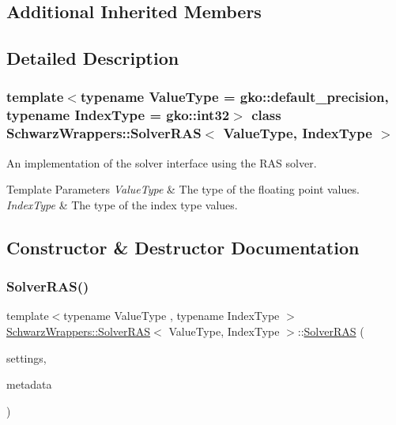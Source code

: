 \subsection*{Additional Inherited Members}


\subsection{Detailed Description}
\subsubsection*{template$<$typename Value\+Type = gko\+::default\+\_\+precision, typename Index\+Type = gko\+::int32$>$\newline
class Schwarz\+Wrappers\+::\+Solver\+R\+A\+S$<$ Value\+Type, Index\+Type $>$}

An implementation of the solver interface using the R\+AS solver. 


\begin{DoxyTemplParams}{Template Parameters}
{\em Value\+Type} & The type of the floating point values. \\
\hline
{\em Index\+Type} & The type of the index type values. \\
\hline
\end{DoxyTemplParams}


\subsection{Constructor \& Destructor Documentation}
\mbox{\label{classSchwarzWrappers_1_1SolverRAS_a4bd8f19ab2a959f1d56bac3939aa5f5f}} 
\subsubsection{\texorpdfstring{Solver\+R\+A\+S()}{SolverRAS()}}
{\footnotesize\ttfamily template$<$typename Value\+Type , typename Index\+Type $>$ \\
\hyperlink{classSchwarzWrappers_1_1SolverRAS}{Schwarz\+Wrappers\+::\+Solver\+R\+AS}$<$ Value\+Type, Index\+Type $>$\+::\hyperlink{classSchwarzWrappers_1_1SolverRAS}{Solver\+R\+AS} (\begin{DoxyParamCaption}\item[{\hyperlink{structSchwarzWrappers_1_1Settings}{Settings} \&}]{settings,  }\item[{\hyperlink{structSchwarzWrappers_1_1Metadata}{Metadata}$<$ Value\+Type, Index\+Type $>$ \&}]{metadata }\end{DoxyParamCaption})}



